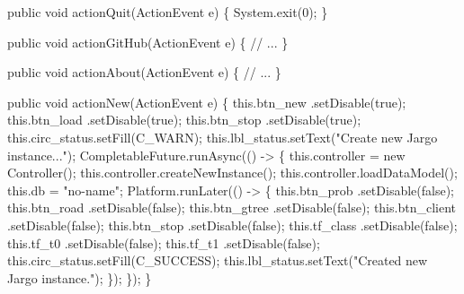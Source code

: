 \documentclass{article}
\def\nwendcode{\endtrivlist \endgroup}      %
\let\nwdocspar=\par
\begin{document}
\nwenddocs{}\endmoddef{}
public void actionQuit(ActionEvent e) \{
  System.exit(0);
\}
\nwendcode{}\nwdocspar

\nwenddocs{}\endmoddef{}
public void actionGitHub(ActionEvent e) \{
  // ...
\}
\nwendcode{}\nwdocspar

\nwenddocs{}\endmoddef{}
public void actionAbout(ActionEvent e) \{
  // ...
\}
\nwendcode{}\nwdocspar

\nwenddocs{}\endmoddef{}
public void actionNew(ActionEvent e) \{
  this.btn_new      .setDisable(true);
  this.btn_load     .setDisable(true);
  this.btn_stop     .setDisable(true);
  this.circ_status.setFill(C_WARN);
  this.lbl_status.setText("Create new Jargo instance...");
  CompletableFuture.runAsync(() -> \{
    this.controller = new Controller();
    this.controller.createNewInstance();
    this.controller.loadDataModel();
    this.db = "no-name";
    Platform.runLater(() -> \{
      this.btn_prob     .setDisable(false);
      this.btn_road     .setDisable(false);
      this.btn_gtree    .setDisable(false);
      this.btn_client   .setDisable(false);
      this.btn_stop     .setDisable(false);
      this.tf_class     .setDisable(false);
      this.tf_t0        .setDisable(false);
      this.tf_t1        .setDisable(false);
      this.circ_status.setFill(C_SUCCESS);
      this.lbl_status.setText("Created new Jargo instance.");
    \});
  \});
\}
\nwendcode{}\nwdocspar
\end{document}

